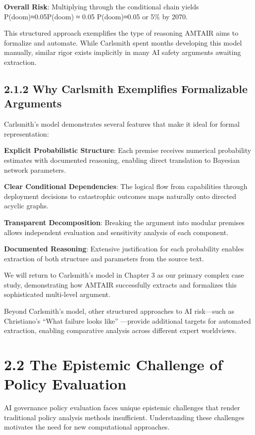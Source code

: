 \documentclass[
  11pt,
  letterpaper,
]{book}
\begin{document}
\textbf{Overall Risk}: Multiplying through the conditional chain yields
P(doom)≈0.05P(doom) ≈ 0.05 P(doom)≈0.05 or 5\% by 2070.

This structured approach exemplifies the type of reasoning AMTAIR aims
to formalize and automate. While Carlsmith spent months developing this
model manually, similar rigor exists implicitly in many AI safety
arguments awaiting extraction.

\subsection{2.1.2 Why Carlsmith Exemplifies Formalizable
Arguments}\label{why-carlsmith-exemplifies-formalizable-arguments}

Carlsmith's model demonstrates several features that make it ideal for
formal representation:

\textbf{Explicit Probabilistic Structure}: Each premise receives
numerical probability estimates with documented reasoning, enabling
direct translation to Bayesian network parameters.

\textbf{Clear Conditional Dependencies}: The logical flow from
capabilities through deployment decisions to catastrophic outcomes maps
naturally onto directed acyclic graphs.

\textbf{Transparent Decomposition}: Breaking the argument into modular
premises allows independent evaluation and sensitivity analysis of each
component.

\textbf{Documented Reasoning}: Extensive justification for each
probability enables extraction of both structure and parameters from the
source text.

We will return to Carlsmith's model in Chapter 3 as our primary complex
case study, demonstrating how AMTAIR successfully extracts and
formalizes this sophisticated multi-level argument.

Beyond Carlsmith's model, other structured approaches to AI risk---such
as Christiano's ``What failure looks like''
\textcite{christiano2019}---provide additional targets for automated
extraction, enabling comparative analysis across different expert
worldviews.

\section{2.2 The Epistemic Challenge of Policy
Evaluation}\label{the-epistemic-challenge-of-policy-evaluation}

AI governance policy evaluation faces unique epistemic challenges that
render traditional policy analysis methods insufficient. Understanding
these challenges motivates the need for new computational approaches.
\end{document}
